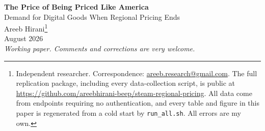 \documentclass[11pt]{article}
\begin{document}
\thispagestyle{empty}

\begin{center}
{\LARGE\bfseries The Price of Being Priced Like America}\\[6pt]
{\large Demand for Digital Goods When Regional Pricing Ends}\\[22pt]
{\large Areeb Hirani\footnote{Independent researcher.
Correspondence: \href{mailto:areeb.research@gmail.com}{areeb.research@gmail.com}.
The full replication package, including every
data-collection script, is public at \url{https://github.com/areebhirani-beep/steam-regional-pricing}. All data come from endpoints requiring no
authentication, and every table and figure in this paper is regenerated from a cold start by
\texttt{run\_all.sh}. All errors are my own.}}\\[16pt]
{\normalsize August 2026}\\[4pt]
{\small\itshape Working paper. Comments and corrections are very welcome.}
\end{center}
\end{document}
